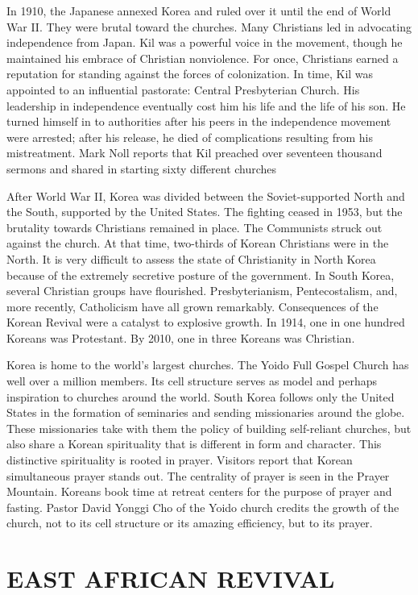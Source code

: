 In 1910, the Japanese annexed Korea and ruled over it until the end of World War II. They were
brutal toward the churches. Many Christians led in advocating independence from Japan. Kil was a
powerful voice in the movement, though he maintained his embrace of Christian nonviolence. For once,
Christians earned a reputation for standing against the forces of colonization. In time, Kil was
appointed to an influential pastorate: Central Presbyterian Church. His leadership in independence
eventually cost him his life and the life of his son. He turned himself in to authorities after his
peers in the independence movement were arrested; after his release, he died of complications
resulting from his mistreatment. Mark Noll reports that Kil preached over seventeen thousand sermons
and shared in starting sixty different churches

After World War II, Korea was divided between the Soviet-supported North and the South, supported by
the United States. The fighting ceased in 1953, but the brutality towards Christians remained in
place. The Communists struck out against the church. At that time, two-thirds of Korean Christians
were in the North. It is very difficult to assess the state of Christianity in North Korea because
of the extremely secretive posture of the government. In South Korea, several Christian groups have
flourished. Presbyterianism, Pentecostalism, and, more recently, Catholicism have all grown
remarkably. Consequences of the Korean Revival were a catalyst to explosive growth. In 1914, one in
one hundred Koreans was Protestant. By 2010, one in three Koreans was Christian.

Korea is home to the world’s largest churches. The Yoido Full Gospel Church has well over a million
members. Its cell structure serves as model and perhaps inspiration to churches around the world.
South Korea follows only the United States in the formation of seminaries and sending missionaries
around the globe. These missionaries take with them the policy of building self-reliant churches,
but also share a Korean spirituality that is different in form and character. This distinctive
spirituality is rooted in prayer. Visitors report that Korean simultaneous prayer stands out. The
centrality of prayer is seen in the Prayer Mountain. Koreans book time at retreat centers for the
purpose of prayer and fasting. Pastor David Yonggi Cho of the Yoido church credits the growth of the
church, not to its cell structure or its amazing efficiency, but to its prayer.

\section{EAST AFRICAN REVIVAL}

